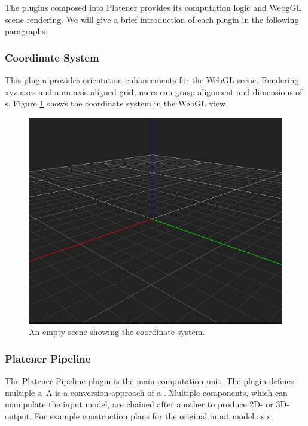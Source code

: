 \documentclass[../ClassicThesis.tex]{subfiles}
\begin{document}
The plugins composed into Platener provides its computation logic and WebgGL
scene rendering. We will give a brief introduction of each plugin in the
following paragraphs.

\subsubsection{Coordinate System}

This plugin provides orientation enhancements for the WebGL scene. Rendering
xyz-axes and a an axis-aligned grid, users can grasp alignment and dimensions of
{\threedmodel}s. Figure \ref{fig:architecture_overview_coordinate_system} shows
the coordinate system in the WebGL view.

\begin{figure}
  \label{fig:architecture_overview_coordinate_system}
  \includegraphics[width=1\columnwidth]{Images/03-architecture_overview_coordinate_system.png}
  \caption{An empty scene showing the coordinate system.}
\end{figure}

\subsubsection{Platener Pipeline}

The Platener Pipeline plugin is the main computation unit. The plugin defines
multiple {\fabmethod}s. A {\fabmethod} is a conversion approach of a
\threedmodel. Multiple components, which can manipulate the input model, are
chained after another to produce 2D- or 3D-output. For example construction
plans for the original input model as {\svgfile}s.
\end{document}
